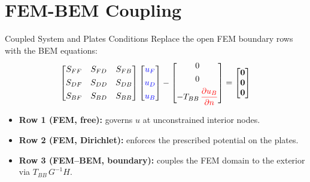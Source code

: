 \documentclass[aspectratio=169]{beamer}
\begin{document}
\section{FEM-BEM Coupling}
\begin{frame}{Coupled System and Plates Conditions}
  Replace the open FEM boundary rows with the BEM equations:
  \[
    \begin{bmatrix}
      S_{FF} & S_{FD} & S_{FB} \\[4pt]
      S_{DF} & S_{DD} & S_{DB} \\[4pt]
      S_{BF} & S_{BD} & S_{BB}
    \end{bmatrix}
    \begin{bmatrix}
      \textcolor{blue}{u_F} \\[4pt]
      \textcolor{blue}{u_D} \\[4pt]
      \textcolor{blue}{u_B}
    \end{bmatrix}
    -
    \begin{bmatrix}
      0 \\[4pt] 0 \\[4pt] -T_{BB}\,\textcolor{red}{\dfrac{\partial u_B}{\partial n}}
    \end{bmatrix}
    =
    \begin{bmatrix} \mathbf{0} \\ \mathbf{0} \\ \mathbf{0} \end{bmatrix}
  \]
  \medskip
  \begin{itemize}
    \item \textbf{Row 1 (FEM, free):} governs $u$ at unconstrained interior nodes.
    \item \textbf{Row 2 (FEM, Dirichlet):} enforces the prescribed potential on the plates.
    \item \textbf{Row 3 (FEM--BEM, boundary):} couples the FEM domain to the exterior via $T_{BB}\,G^{-1}H$.
  \end{itemize}
\end{frame}
\end{document}
